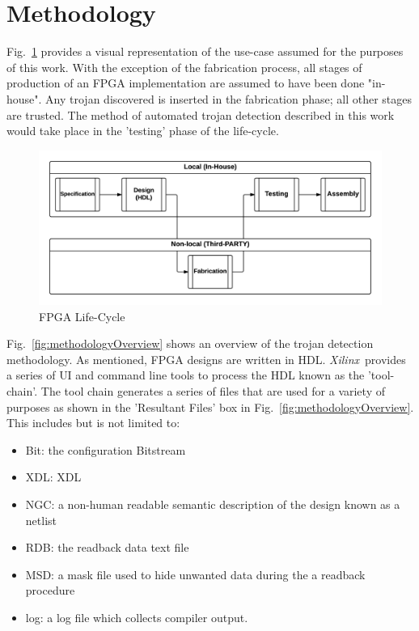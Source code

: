 \documentclass[conference]{IEEEtran}
\newcommand{\Xilinx}{\textit{\gls{Xilinx}}~}
\begin{document}
\section{Methodology} \label{sec:methodolgy}
Fig.~\ref{fig:Concept} provides a visual representation of the use-case assumed for the purposes of this work. 
With the exception of the fabrication process, all stages of production of an \acrshort{FPGA} implementation are assumed to have been done "in-house". 
Any trojan discovered is inserted in the fabrication phase; all other stages are trusted.  
The method of automated trojan detection described in this work would take place in the 'testing' phase of the life-cycle. 
\begin{figure}[h]
	\centering
	\includegraphics[width=1\linewidth]{../Thesis/Figures/Concept}
	\caption[FPGA Life-Cycle]{FPGA Life-Cycle}
	\label{fig:Concept}
\end{figure}
Fig.~\ref{fig:methodologyOverview} shows an overview of the trojan detection methodology.
As mentioned, \acrshort{FPGA} designs are written in \acrshort{HDL}.
\Xilinx provides a series of \acrfull{UI} and command line tools to process the \acrshort{HDL} known as the 'tool-chain'.
The tool chain generates a series of files that are used for a variety of purposes as shown in the 'Resultant Files' box in Fig.~\ref{fig:methodologyOverview}.
This includes but is not limited to:
\begin{itemize}
	\item Bit: the configuration \gls{Bitstream}
	\item \acrshort{XDL}: \acrfull{XDL}
	\item NGC: a non-human readable semantic description of the design known as a netlist
	\item RDB: the readback data text file
	\item MSD: a mask file used to hide unwanted data during the a readback procedure
	\item log: a log file which collects compiler output.
\end{itemize}
\end{document}

